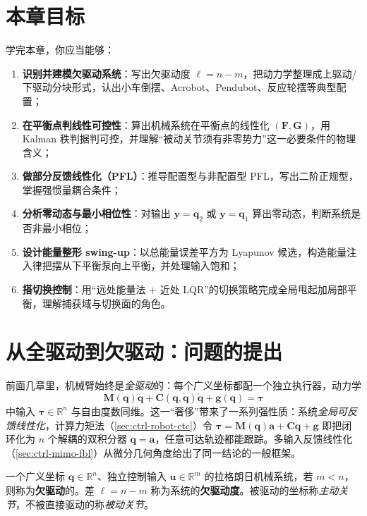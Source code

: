 \section*{本章目标}
学完本章，你应当能够：
\begin{enumerate}
  \item \textbf{识别并建模欠驱动系统}：写出欠驱动度 $\ell=n-m$，把动力学整理成上驱动/下驱动分块形式，认出小车倒摆、Acrobot、Pendubot、反应轮摆等典型配置；
  \item \textbf{在平衡点判线性可控性}：算出机械系统在平衡点的线性化 $(\mathbf{F},\mathbf{G})$，用 Kalman 秩判据判可控，并理解“被动关节须有非零势力”这一必要条件的物理含义；
  \item \textbf{做部分反馈线性化（PFL）}：推导配置型与非配置型 PFL，写出二阶正规型，掌握强惯量耦合条件；
  \item \textbf{分析零动态与最小相位性}：对输出 $\mathbf{y}=\mathbf{q}_2$ 或 $\mathbf{y}=\mathbf{q}_1$ 算出零动态，判断系统是否非最小相位；
  \item \textbf{设计能量整形 swing-up}：以总能量误差平方为 Lyapunov 候选，构造能量注入律把摆从下平衡泵向上平衡，并处理输入饱和；
  \item \textbf{搭切换控制}：用“远处能量法 $+$ 近处 LQR”的切换策略完成全局甩起加局部平衡，理解捕获域与切换面的角色。
\end{enumerate}

\section{从全驱动到欠驱动：问题的提出}\label{sec:ua-intro}

前面几章里，机械臂始终是\emph{全驱动}的：每个广义坐标都配一个独立执行器，动力学
\begin{equation}\label{eq:ua-fullact}
  \mathbf{M}(\mathbf{q})\ddot{\mathbf{q}}+\mathbf{C}(\mathbf{q},\dot{\mathbf{q}})\dot{\mathbf{q}}+\mathbf{g}(\mathbf{q})=\boldsymbol{\tau}
\end{equation}
中输入 $\boldsymbol{\tau}\in\mathbb{R}^n$ 与自由度数同维。这一“奢侈”带来了一系列强性质：系统\emph{全局可反馈线性化}，计算力矩法（\cref{sec:ctrl-robot-ctc}）令 $\boldsymbol{\tau}=\mathbf{M}(\mathbf{q})\mathbf{a}+\mathbf{C}\dot{\mathbf{q}}+\mathbf{g}$ 即把闭环化为 $n$ 个解耦的双积分器 $\ddot{\mathbf{q}}=\mathbf{a}$，任意可达轨迹都能跟踪。多输入反馈线性化（\cref{sec:ctrl-mimo-fbl}）从微分几何角度给出了同一结论的一般框架。

\begin{definition}[欠驱动机械系统]\label{def:ua-underactuated}
一个广义坐标 $\mathbf{q}\in\mathbb{R}^n$、独立控制输入 $\mathbf{u}\in\mathbb{R}^m$ 的拉格朗日机械系统，若 $m<n$，则称为\textbf{欠驱动}的。差 $\ell=n-m$ 称为系统的\textbf{欠驱动度}。被驱动的坐标称\emph{主动关节}，不被直接驱动的称\emph{被动关节}。
\end{definition}

